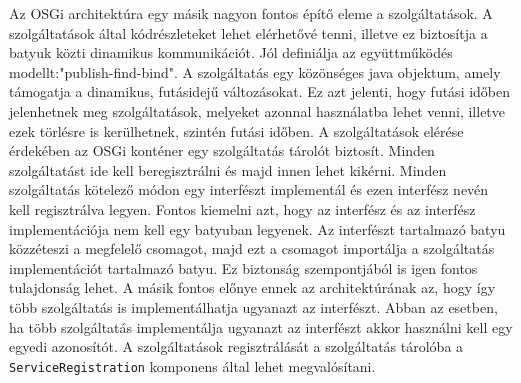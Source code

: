 Az OSGi architektúra egy másik nagyon fontos építő eleme a szolgáltatások. A szolgáltatások által kódrészleteket lehet elérhetővé tenni, illetve ez biztosítja a batyuk közti dinamikus kommunikációt. Jól definiálja az együttműködés modellt:"publish-find-bind". A szolgáltatás egy közönséges java objektum, amely támogatja a dinamikus, futásidejű változásokat. Ez azt jelenti, hogy futási időben jelenhetnek meg szolgáltatások, melyeket azonnal használatba lehet venni, illetve ezek törlésre is kerülhetnek, szintén futási időben. A szolgáltatások elérése érdekében az OSGi konténer egy szolgáltatás tárolót biztosít. Minden szolgáltatást ide kell beregisztrálni és majd innen lehet kikérni. Minden szolgáltatás kötelező módon egy interfészt implementál és ezen interfész nevén kell regisztrálva legyen. Fontos kiemelni azt, hogy az interfész és az interfész implementációja nem kell egy batyuban legyenek. Az interfészt tartalmazó batyu közzéteszi a megfelelő csomagot, majd ezt a csomagot importálja a szolgáltatás implementációt tartalmazó batyu. Ez biztonság szempontjából is igen fontos tulajdonság lehet. A másik fontos előnye ennek az architektúrának az, hogy így több szolgáltatás is implementálhatja ugyanazt az interfészt. Abban az esetben, ha több szolgáltatás implementálja ugyanazt az interfészt akkor használni kell egy egyedi azonosítót. A szolgáltatások regisztrálását a szolgáltatás tárolóba a \texttt{ServiceRegistration} komponens által lehet megvalósítani.

\lstset{language=Java}


